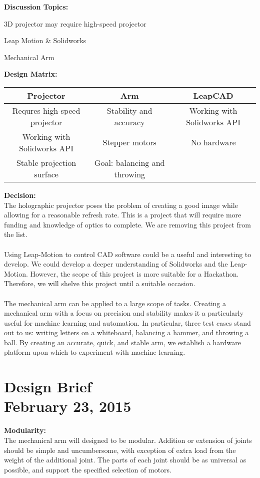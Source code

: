 \documentclass[11pt]{article}
\begin{document}
\noindent \textbf{Discussion Topics:}
\begin{compactitem}
	\item 3D projector may require high-speed projector
	\item Leap Motion \& Solidworks
	\item Mechanical Arm
\end{compactitem}

\noindent \textbf{Design Matrix:}
\begin{center}
  \begin{tabular}{ c | c | c }
  	Projector & Arm & LeapCAD \\
    \hline
    Requres high-speed projector & Stability and accuracy & Working with Solidworks API\\
    Working with Solidworks API & Stepper motors & No hardware \\
    Stable projection surface & Goal: balancing and throwing & \\
  \end{tabular}
\end{center}

\noindent \textbf{Decision:}\\
\indent The holographic projector poses the problem of creating a good image while allowing for a reasonable refresh rate. This is a project that will require more funding and knowledge of optics to complete. We are removing this project from the list.\\
\\
\indent Using Leap-Motion to control CAD software could be a useful and interesting to develop. We could develop a deeper understanding of Solidworks and the Leap-Motion. However, the scope of this project is more suitable for a Hackathon. Therefore, we will shelve this project until a suitable occasion.\\
\\
\indent The mechanical arm can be applied to a large scope of tasks. Creating a mechanical arm with a focus on precision and stability makes it a particularly useful for machine learning and automation. In particular, three test cases stand out to us: writing letters on a whiteboard, balancing a hammer, and throwing a ball. By creating an accurate, quick, and stable arm, we establish a hardware platform upon which to experiment with machine learning.\\

\newpage
\section{Design Brief \\ February 23, 2015}
\noindent \textbf{Modularity:}\\
\indent The mechanical arm will designed to be modular. Addition or extension of joints should be simple and uncumbersome, with exception of extra load from the weight of the additional joint. The parts of each joint should be as universal as possible, and support the specified selection of motors.\\
\end{document}

